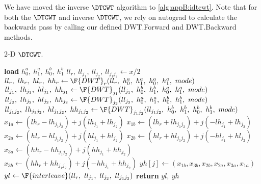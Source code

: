 We have moved the inverse $\DTCWT$ algorithm to \autoref{alg:appB:idtcwt}. Note
that for both the $\DTCWT$ and inverse $\DTCWT$, we rely on autograd to
calculate the backwards pass by calling our defined DWT.Forward and 
DWT.Backward methods.

\begin{algorithm}[t]
\caption{2-D $\DTCWT$. }\label{alg:ch3:dtcwt}
\begin{algorithmic}[1]
\State \textbf{load} $h_0^a,\ h_1^a,\ h_0^b,\ h_1^b$ 
\State $ll_{r},\ ll_{j_1},\ ll_{j_2},\ ll_{j_1j_2} \gets x/2$
\State $ll_{r},\ lh_{r},\ hl_{r},\ hh_{r} \gets \F{DWT}_{r}(ll_{r},\ h_0^a,\ h_1^a,\ h_0^a,\ h_1^a,\ mode)$
\State $ll_{j_1},\ lh_{j_1},\ hl_{j_1},\ hh_{j_1} \gets \F{DWT}_{j_1}(ll_{j_1},\ h_0^b,\ h_1^b,\ h_0^a,\ h_1^a,\ mode)$
\State $ll_{j_2},\ lh_{j_2},\ hl_{j_2},\ hh_{j_2} \gets \F{DWT}_{j_2}(ll_{j_2},\ h_0^a,\ h_1^a,\ h_0^b,\ h_1^b,\ mode)$
\State $ll_{j_1j_2},\ lh_{j_1j_2},\ hl_{j_1j_2},\ hh_{j_1j_2} \gets \F{DWT}_{j_1j_2}(ll_{j_1j_2},\ h_0^b,\ h_1^b,\ h_0^b,\ h_1^b,\ mode)$
  \State $x_{1a} \gets (lh_{r} - lh_{j_1j_2}) + j(lh_{j_1} + lh_{j_2}) $ 
  \State $x_{1b} \gets (lh_{r} + lh_{j_1j_2}) + j(-lh_{j_1} + lh_{j_2}) $ 
  \State $x_{2a} \gets (hl_{r} - hl_{j_1j_2}) + j(hl_{j_1} + hl_{j_2}) $ 
  \State $x_{2b} \gets (hl_{r} + hl_{j_1j_2}) + j(-hl_{j_1} + hl_{j_2}) $ 
  \State $x_{3a} \gets (hh_{r} - hh_{j_1j_2}) + j(hh_{j_1} + hh_{j_2}) $ 
  \State $x_{3b} \gets (hh_{r} + hh_{j_1j_2}) + j(-hh_{j_1} + hh_{j_2}) $ 
  \State $yh[j] \gets (x_{1b},x_{3b}, x_{2b}, x_{2a}, x_{3a}, x_{1a}) $
\EndFor
\State $yl \gets \F{interleave}(ll_{r},\ ll_{j_1},\ ll_{j_2},\ ll_{j_1j_2})$
\State \textbf{return} $yl,\ yh$
\EndFunction
\end{algorithmic}
\end{algorithm}

